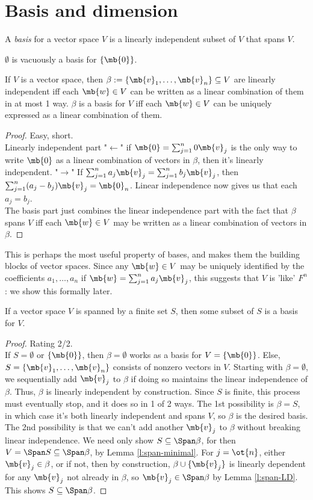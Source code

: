 \section{Basis and dimension}
\begin{defn}
A \emph{basis} for a vector space $V$ is a linearly independent subset of $V$ that spans $V$.
\end{defn}
$\emptyset$ is vacuously a basis for $\{ \mb{0}\}$.
\begin{lem}\label{l:basis-unique-lincomb}
If $V$ is a vector space, then $\beta:= \{\mb{v}_1, \ldots, \mb{v}_n \}\subseteq V$ are linearly independent iff each $\mb{w}\in V$ can be written as a linear combination of them in at most 1 way. $\beta$ is a basis for $V$ iff each $\mb{w}\in V$ can be uniquely expressed as a linear combination of them.
\end{lem}
\begin{proof}
Easy, short.\\
Linearly independent part "$\leftarrow$" if $\mb{0}= \sum_{j=1}^n0 \mb{v}_j$ is the only way to write $\mb{0}$ as a linear combination of vectors in $\beta$, then it's linearly independent. "$\to$" If $\sum_{j=1}^na_j \mb{v}_j= \sum_{j=1}^nb_j \mb{v}_j$, then $\sum_{j=1}^n(a_j-b_j) \mb{v}_j= \mb{0}_n$. Linear independence now gives us that each $a_j=b_j$.\\
The basis part just combines the linear independence part with the fact that $\beta$ spans $V$ iff each $\mb{w}\in V$ may be written as a linear combination of vectors in $\beta$. 
\end{proof}
This is perhaps the most useful property of bases, and makes them the building blocks of vector spaces. Since any $\mb{w}\in V$ may be uniquely identified by the coefficients $a_1, \ldots,a_n$ if $\mb{w}= \sum_{j=1}^na_j \mb{v}_j$, this suggests that $V$ is 'like' $F^n$: we show this formally later.
\begin{lem}\label{l:reduce-span-to-basis}
If a vector space $V$ is spanned by a finite set $S$, then some subset of $S$ is a basis for $V$.
\end{lem}
\begin{proof}
Rating 2/2.\\
If $S= \emptyset$ or $\{ \mb{0}\}$, then $\beta= \emptyset$ works as a basis for $V= \{ \mb{0}\}$. Else, $S= \{ \mb{v}_1, \ldots, \mb{v}_n \}$ consists of nonzero vectors in $V$. Starting with $\beta= \emptyset$, we sequentially add $\mb{v}_j$ to $\beta$ if doing so maintains the linear independence of $\beta$. Thus, $\beta$ is linearly independent by construction.
Since $S$ is finite, this process must eventually stop, and it does so in 1 of 2 ways. The 1st possibility is $\beta=S$, in which case it's both linearly independent and spans $V$, so $\beta$ is the desired basis.
The 2nd possibility is that we can't add another $\mb{v}_j$ to $\beta$ without breaking linear independence. We need only show $S \subseteq \Span \beta$, for then $V= \Span S \subseteq \Span \beta$, by Lemma \ref{l:span-minimal}. For $j=\ot{n}$, either $\mb{v}_j \in \beta$, or if not, then by construction, $\beta \cup \{ \mb{v}_j \}$ is linearly dependent for any $\mb{v}_j$ not already in $\beta$, so $\mb{v}_j \in \Span \beta$ by Lemma \ref{l:span-LD}. This shows $S \subseteq \Span \beta$.
\end{proof}
